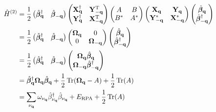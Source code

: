 \begin{align}
    \hat{H}^{(2)}
    &=
    \frac{1}{2}
    \begin{pmatrix}
        \hat{\bm{\beta}}_{\mathbf q}^{\dagger} &
        \hat{\bm{\beta}}_{-\mathbf q}
    \end{pmatrix}
    \begin{pmatrix}
        \mathbf X_{\mathbf q}^{\dagger} & \mathbf Y_{-\mathbf q}^{\rm T}\\
        \mathbf Y_{\mathbf q}^{\dagger} & \mathbf X_{-\mathbf q}^{\rm T}
    \end{pmatrix}
    \begin{pmatrix}
        A & B\\
        B^{*} & A^{*}
    \end{pmatrix}
    \begin{pmatrix}
        \mathbf X_{\mathbf q} & \mathbf Y_{\mathbf q}\\
        \mathbf Y_{-\mathbf q}^{*} & \mathbf X_{-\mathbf q}^{*}
    \end{pmatrix}
    \begin{pmatrix}
        \hat{\bm{\beta}}_{\mathbf q}\\
        \hat{\bm{\beta}}_{-\mathbf q}^{\dagger}
    \end{pmatrix}\\
    &=
    \frac{1}{2}
    \begin{pmatrix}
        \hat{\bm{\beta}}_{\mathbf q}^{\dagger} &
        \hat{\bm{\beta}}_{-\mathbf q}
    \end{pmatrix}
    \begin{pmatrix}
        \boldsymbol{\Omega}_{\mathbf q} & 0\\
        0 & \boldsymbol{\Omega}_{-\mathbf q}
    \end{pmatrix}
    \begin{pmatrix}
        \hat{\bm{\beta}}_{\mathbf q}\\
        \hat{\bm{\beta}}_{-\mathbf q}^{\dagger}
    \end{pmatrix}\\
    &=\frac{1}{2}\begin{pmatrix}
        \hat{\bm{\beta}}_{\mathbf q}^{\dagger} &
        \hat{\bm{\beta}}_{-\mathbf q}
    \end{pmatrix}
    \begin{pmatrix}
        \boldsymbol{\Omega}_{\mathbf q} \hat{\bm{\beta}}_{\mathbf q}\\
        \boldsymbol{\Omega}_{-\mathbf q} \hat{\bm{\beta}}_{-\mathbf q}^{\dagger}
    \end{pmatrix}\\
    &=
    \hat{\bm{\beta}}_{\mathbf q}^{\dagger} \boldsymbol{\Omega}_{\mathbf q} \hat{\bm{\beta}}_{\mathbf q}
    +
    \frac{1}{2}\operatorname{Tr}(\boldsymbol{\Omega}_{\mathbf q}-A)+\frac{1}{2}\operatorname{Tr}(A)\\
&= \sum_{\nu_{\mathbf q}} \omega_{\nu_{\mathbf q}} \hat{\beta}_{\nu_{\mathbf q}}^{\dagger} \hat{\beta}_{\nu_{\mathbf q}} + E_{\rm RPA} + \frac{1}{2}\operatorname{Tr}(A)
\end{align}
